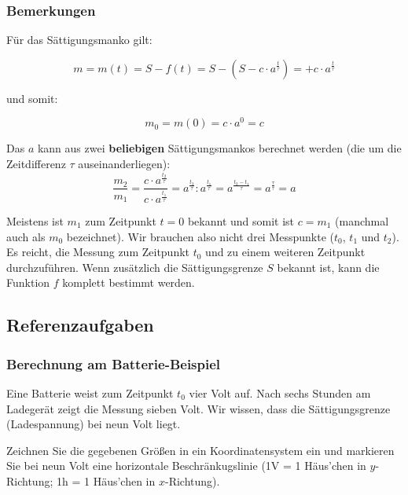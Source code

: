 \subsubsection{Bemerkungen}
\begin{bemerkung}{}{}
  Für das Sättigungsmanko gilt:

$$m = m(t) = S-f(t) = S- \left(S-c\cdot{}a^{\frac{t}{\tau}}\right) = + c\cdot{}a^{\frac{t}{\tau}}$$

und somit:

$$m_0 = m(0) = c\cdot{}a^0 = c$$
\end{bemerkung}

\begin{bemerkung}{}{}
Das $a$ kann aus zwei \textbf{beliebigen} Sättigungsmankos berechnet werden (die um die
Zeitdifferenz $\tau$ auseinanderliegen):
$$\frac{m_2}{m_1} = \frac{c\cdot{}a^{\frac{t_2}{\tau}}}{c\cdot{}
  a^{\frac{t_1}{\tau}}} = a^{\frac{t_2}{\tau}} : a^{\frac{t_1}{\tau}} =
a^{\frac{t_2-t_1}{\tau}} = a^{\frac{\tau}{\tau}} = a$$
\end{bemerkung}


\begin{bemerkung}{}{}
Meistens ist $m_1$ zum Zeitpunkt $t=0$ bekannt und somit ist $c=m_1$ (manchmal auch als $m_0$ bezeichnet). Wir brauchen also nicht drei Messpunkte ($t_0$, $t_1$ und $t_2$). Es reicht, die Messung zum Zeitpunkt $t_0$ und zu einem weiteren Zeitpunkt durchzuführen. Wenn zusätzlich die Sättigungsgrenze $S$ bekannt ist, kann die Funktion $f$ komplett bestimmt werden.
\end{bemerkung}
\newpage

\subsection{Referenzaufgaben}

\subsubsection{Berechnung am Batterie-Beispiel}
Eine Batterie weist zum Zeitpunkt $t_0$ vier Volt auf. Nach sechs Stunden am Ladegerät zeigt die Messung sieben Volt. Wir wissen, dass die Sättigungsgrenze (Ladespannung) bei neun Volt liegt.

Zeichnen Sie die gegebenen Größen in ein Koordinatensystem ein und markieren Sie bei neun Volt eine horizontale Beschränkugslinie (\zB 1V = 1 Häus'chen in $y$-Richtung; 1h = 1 Häus'chen in $x$-Richtung).



